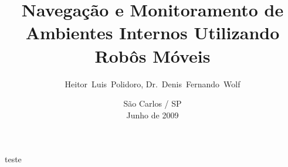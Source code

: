 \documentclass[9pt,journal]{IEEEtran}
\begin{document}
	\title{Navegação e Monitoramento de Ambientes Internos Utilizando Robôs Móveis}
	\author{Heitor~Luis~Polidoro, Dr.~Denis~Fernando~Wolf}
	\date{São Carlos / SP\\Junho de 2009}
	\maketitle

	
	
	



	teste\cite{Polidoro2007}
	
	
\end{document}
